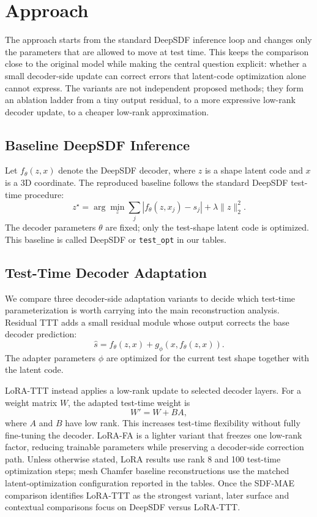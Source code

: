 \documentclass[letterpaper]{article}
\begin{document}
\section{Approach}

The approach starts from the standard DeepSDF inference loop and changes only the parameters that are allowed to move at test time. This keeps the comparison close to the original model while making the central question explicit: whether a small decoder-side update can correct errors that latent-code optimization alone cannot express. The variants are not independent proposed methods; they form an ablation ladder from a tiny output residual, to a more expressive low-rank decoder update, to a cheaper low-rank approximation.

\subsection{Baseline DeepSDF Inference}

Let $f_\theta(z, x)$ denote the DeepSDF decoder, where $z$ is a shape latent code and $x$ is a 3D coordinate. The reproduced baseline follows the standard DeepSDF test-time procedure:
\[
z^\star = \arg\min_z \sum_j |f_\theta(z, x_j)-s_j| + \lambda \|z\|_2^2 .
\]
The decoder parameters $\theta$ are fixed; only the test-shape latent code is optimized. This baseline is called DeepSDF or \texttt{test\_opt} in our tables.

\subsection{Test-Time Decoder Adaptation}

We compare three decoder-side adaptation variants to decide which test-time parameterization is worth carrying into the main reconstruction analysis. Residual TTT adds a small residual module whose output corrects the base decoder prediction:
\[
\hat{s}=f_\theta(z,x)+g_\phi(x,f_\theta(z,x)).
\]
The adapter parameters $\phi$ are optimized for the current test shape together with the latent code.

LoRA-TTT instead applies a low-rank update to selected decoder layers. For a weight matrix $W$, the adapted test-time weight is
\[
W' = W + BA ,
\]
where $A$ and $B$ have low rank. This increases test-time flexibility without fully fine-tuning the decoder. LoRA-FA is a lighter variant that freezes one low-rank factor, reducing trainable parameters while preserving a decoder-side correction path. Unless otherwise stated, LoRA results use rank 8 and 100 test-time optimization steps; mesh Chamfer baseline reconstructions use the matched latent-optimization configuration reported in the tables. Once the SDF-MAE comparison identifies LoRA-TTT as the strongest variant, later surface and contextual comparisons focus on DeepSDF versus LoRA-TTT.
\end{document}
